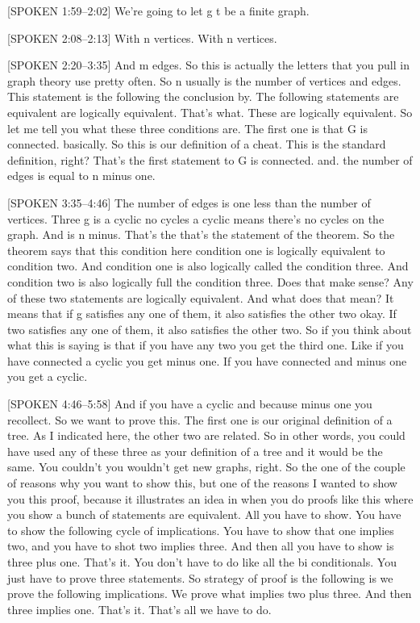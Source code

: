 \documentclass[11pt]{article}
\theoremstyle{definition}
\begin{document}
[SPOKEN 1:59–2:02]
We're going to let g t be a finite graph.

[SPOKEN 2:08–2:13]
With n vertices. With n vertices.

[SPOKEN 2:20–3:35]
And m edges. So this is actually the letters that you pull in graph theory use pretty often. So n usually is the number of vertices and edges. This statement is the following the conclusion by. The following statements are equivalent are logically equivalent. That's what. These are logically equivalent. So let me tell you what these three conditions are. The first one is that G is connected. basically. So this is our definition of a cheat. This is the standard definition, right? That's the first statement to G is connected. and. the number of edges is equal to n minus one.

[SPOKEN 3:35–4:46]
The number of edges is one less than the number of vertices. Three g is a cyclic no cycles a cyclic means there's no cycles on the graph. And is n minus. That's the that's the statement of the theorem. So the theorem says that this condition here condition one is logically equivalent to condition two. And condition one is also logically called the condition three. And condition two is also logically full the condition three. Does that make sense? Any of these two statements are logically equivalent. And what does that mean? It means that if g satisfies any one of them, it also satisfies the other two okay. If two satisfies any one of them, it also satisfies the other two. So if you think about what this is saying is that if you have any two you get the third one. Like if you have connected a cyclic you get minus one. If you have connected and minus one you get a cyclic.

[SPOKEN 4:46–5:58]
And if you have a cyclic and because minus one you recollect. So we want to prove this. The first one is our original definition of a tree. As I indicated here, the other two are related. So in other words, you could have used any of these three as your definition of a tree and it would be the same. You couldn’t you wouldn’t get new graphs, right. So the one of the couple of reasons why you want to show this, but one of the reasons I wanted to show you this proof, because it illustrates an idea in when you do proofs like this where you show a bunch of statements are equivalent. All you have to show. You have to show the following cycle of implications. You have to show that one implies two, and you have to shot two implies three. And then all you have to show is three plus one. That's it. You don’t have to do like all the bi conditionals. You just have to prove three statements. So strategy of proof is the following is we prove the following implications. We prove what implies two plus three. And then three implies one. That's it. That's all we have to do.
\end{document}
